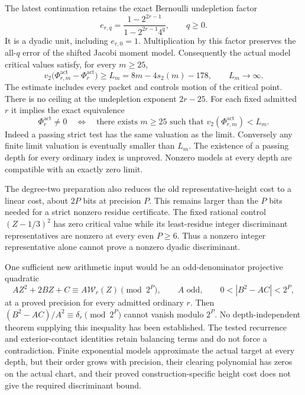 The latest continuation retains the exact Bernoulli undepletion factor
\[
 e_{r,q}=\frac{1-2^{2r-1}}{1-2^{2r-1}4^q},\qquad q\ge0.
\]
It is a dyadic unit, including $e_{r,0}=1$. Multiplication by this
factor preserves the all-$q$ error of the shifted Jacobi moment model.
Consequently the actual model critical values satisfy, for every $m\ge25$,
\begin{equation}
 v_2\bigl(\Phi_{r,m}^{\mathrm{act}}-\Phi_r^{\mathrm{act}}\bigr)
 \ge L_m=8m-4s_2(m)-178,
 \qquad L_m\longrightarrow\infty.
 \label{eq:root:actualapprox}
\end{equation}
The estimate includes every packet and controls motion of the critical
point. There is no ceiling at the undepletion exponent $2r-25$.
For each fixed admitted $r$ it implies the exact equivalence
\begin{equation}
 \Phi_r^{\mathrm{act}}\ne0
 \quad\Longleftrightarrow\quad
 \text{there exists }m\ge25\text{ such that }
 v_2(\Phi_{r,m}^{\mathrm{act}})<L_m.
 \label{eq:root:stricttest}
\end{equation}
Indeed a passing strict test has the same valuation as the limit. Conversely
any finite limit valuation is eventually smaller than $L_m$.
The existence of a passing depth for every ordinary index is unproved.
Nonzero models at every depth are compatible with an exactly zero limit.

The degree-two preparation also reduces the old representative-height
cost to a linear cost, about $2P$ bits at precision $P$. This remains
larger than the $P$ bits needed for a strict nonzero residue certificate.
The fixed rational control $(Z-1/3)^2$ has zero critical value while
its least-residue integer discriminant representatives are nonzero at
every even $P\ge6$. Thus a nonzero integer representative alone cannot
prove a nonzero dyadic discriminant.

One sufficient new arithmetic input would be an odd-denominator
projective quadratic
\[
 A Z^2+2BZ+C\equiv A\mathcal W_r(Z)\pmod{2^P},\qquad A\text{ odd},
 \qquad 0<|B^2-AC|<2^P,
\]
at a proved precision for every admitted ordinary $r$.
Then $(B^2-AC)/A^2\equiv\delta_r\pmod{2^P}$ cannot vanish
modulo $2^P$. No depth-independent theorem supplying this inequality
has been established. The tested recurrence and exterior-contact
identities retain balancing terms and do not force a contradiction.
Finite exponential models approximate the actual target at every depth,
but their order grows with precision, their clearing polynomial has
zeros on the actual chart, and their proved construction-specific height
cost does not give the required discriminant bound.

